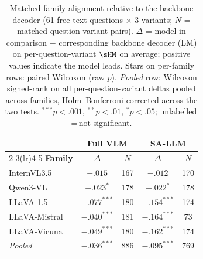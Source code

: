 \begin{table}[ht]
\centering\small\setlength{\tabcolsep}{5pt}
\begin{tabular}{l cc cc}
\toprule
& \multicolumn{2}{c}{\textbf{Full VLM}} & \multicolumn{2}{c}{\textbf{SA-LLM}} \\
\cmidrule(lr){2-3}\cmidrule(lr){4-5}
\textbf{Family} & $\Delta$ & $N$ & $\Delta$ & $N$ \\
\midrule
InternVL3.5 & $+.015$ & 167 & $-.012$ & 170 \\
Qwen3-VL & $-.023^{*}$ & 178 & $-.022^{*}$ & 178 \\
LLaVA-1.5 & $-.077^{***}$ & 180 & $-.154^{***}$ & 174 \\
LLaVA-Mistral & $-.040^{***}$ & 181 & $-.164^{***}$ & 73 \\
LLaVA-Vicuna & $-.049^{***}$ & 180 & $-.162^{***}$ & 174 \\
\midrule
\textit{Pooled} & $-.036^{***}$ & 886 & $-.095^{***}$ & 769 \\
\bottomrule
\end{tabular}
\caption{Matched-family alignment relative to the backbone decoder (61 free-text questions $\times$ 3 variants; $N$ = matched question-variant pairs).
$\Delta$ = model in comparison $-$ corresponding backbone decoder (LM) on per-question-variant $\sHM$ on average; positive values indicate the model leads.
Stars on per-family rows: paired Wilcoxon (raw $p$). \textit{Pooled} row: Wilcoxon signed-rank on all per-question-variant deltas pooled across families, Holm--Bonferroni corrected across the two tests. ${}^{***}p{<}.001$, ${}^{**}p{<}.01$, ${}^{*}p{<}.05$; unlabelled\,=\,not significant.}
\label{tab:matched_family_alignment_tests_ft}
\end{table}